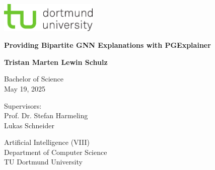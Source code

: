 \begin{titlepage}
    \begin{center}
        \begin{minipage}[t]{\textwidth}
            \raggedleft
            \includegraphics[width=0.35\textwidth]{img/tud-logo.pdf}
        \end{minipage}
    
        \vspace{3cm}
            
        \Huge
        \textbf{Providing Bipartite GNN Explanations with PGExplainer}
            
        \vspace{1.5cm}
            
        \LARGE
        \textbf{Tristan Marten Lewin Schulz}
            
        \vspace{1.5cm}
          
        \Large
        Bachelor of Science\\
        May 19, 2025\\
    \end{center}

    \vfill

    \noindent
    \begin{minipage}[t]{0.5\textwidth}
        \raggedright
        \Large
        Supervisors:\\
        Prof. Dr. Stefan Harmeling\\
        Lukas Schneider\\
    \end{minipage}
    \hfill
    \begin{minipage}[t]{0.5\textwidth}
        \raggedleft
        \Large
        Artificial Intelligence (VIII)\\
        Department of Computer Science\\
        TU Dortmund University\\
    \end{minipage}
\end{titlepage}
